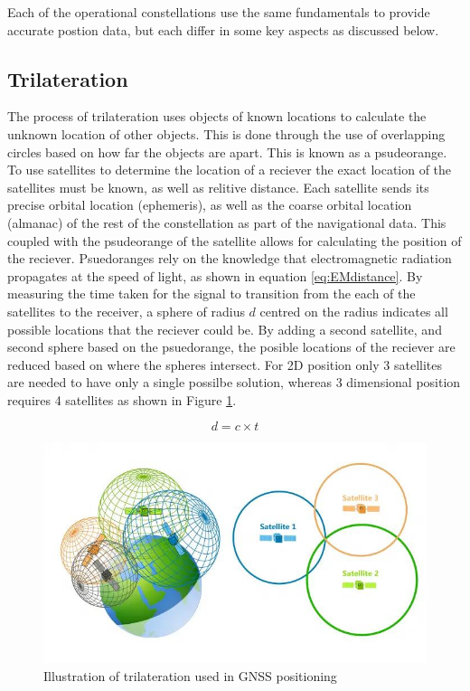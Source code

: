 Each of the operational constellations use the same fundamentals to provide accurate postion data, but each differ in some key aspects as discussed below.

\subsection{Trilateration} \label{subsec:Trilateration}
The process of trilateration uses objects of known locations to calculate the unknown location of other objects. This is done through the use of overlapping circles based
on how far the objects are apart. This is known as a psudeorange. To use satellites to determine the location of a reciever the exact location of the satellites must be
known, as well as relitive distance. Each satellite sends its precise orbital location (ephemeris), as well as the coarse orbital location (almanac) of the rest of the
constellation as part of the navigational data. This coupled with the psudeorange of the satellite allows for calculating the position of the reciever. Psuedoranges rely
on the knowledge that electromagnetic radiation propagates at the speed of light, as shown in equation \ref{eq:EMdistance}. By measuring the time taken for the signal to
transition from the each of the satellites to the receiver, a sphere of radius $d$ centred on the radius indicates all possible locations that the reciever could be. By
adding a second satellite, and second sphere based on the psuedorange, the posible locations of the reciever are reduced based on where the spheres intersect. For 2D
position only 3 satellites are needed to have only a single possilbe solution, whereas 3 dimensional position requires 4 satellites as shown in Figure
\ref{fig:trilateration}.

\begin{equation} \label{eq:EMdistance}
    d = c \times t
\end{equation}

\begin{figure}[h]
    \begin{centering}
        \includegraphics[width=14cm,keepaspectratio]{Figures/trilateration.png}
        \caption{Illustration of trilateration used in GNSS positioning}
        \label{fig:trilateration}
    \end{centering}
\end{figure}

